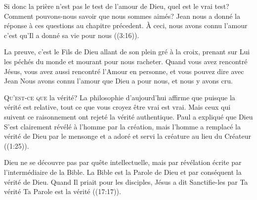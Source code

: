 Si donc la prière n'est pas le test de l'amour de Dieu, quel est le vrai test?
 Comment pouvons-nous savoir que nous sommes aimés?
 Jean nous a donné la réponse à ces questions au chapitre précedent.
 \Og À ceci, nous avons connu l'amour\frcolon{}
 c'est qu'Il a donné sa vie pour nous \Fg{} ((3:16)). 


La preuve, c'est le Fils de Dieu allant de son plein gré à la croix,
 prenant sur Lui les péchés du monde et mourant pour nous racheter.
 Quand vous avez rencontré Jésus, vous avez aussi rencontré
 l'Amour en personne, et vous pouvez dire avec Jean\frcolon{} 
 \Og Nous avons connu l'amour que Dieu a pour nous, et nous y avons cru. \Fg{}

\dvrule








\lettrine{Q}{u'est-ce que} la vérité?
 La philosophie d'aujourd'hui affirme que 
 \Og puisque la vérité est relative, \Fg{} 
 tout ce que vous croyez être vrai est vrai.
 Mais ceux qui suivent ce raisonnement ont rejeté la vérité authentique.
 Paul a expliqué que Dieu S'est clairement révélé à l'homme par la création,
 mais l'homme \Og a remplacé la vérité de Dieu par le mensonge
 et a adoré et servi la créature au lieu du Créateur \Fg{}
 ((1:25)). 


Dieu ne se découvre pas par quête intellectuelle, mais par révélation écrite
 \ocadr par l'intermédiaire de la Bible.
 La Bible est la Parole de Dieu et par conséquent la vérité de Dieu.
 Quand Il priait pour les disciples, Jésus a dit\frcolon{} 
 \Og Sanctifie-les par Ta vérité\frcolon{} Ta Parole est la vérité \Fg{} 
 ((17:17)). 

